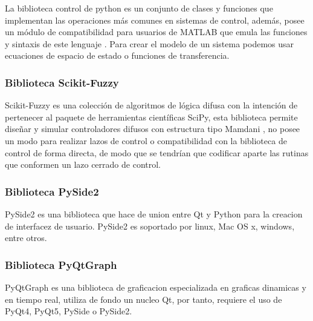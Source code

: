             La biblioteca control de python es un conjunto de clases y funciones que implementan las operaciones más comunes en sistemas de control, además, posee un módulo de compatibilidad para usuarios de MATLAB que emula las funciones y sintaxis de este lenguaje \Parencite{pythoncontrol}. Para crear el modelo de un sistema podemos usar ecuaciones de espacio de estado o funciones de transferencia.

        \subsubsection{Biblioteca Scikit-Fuzzy}
            
            Scikit-Fuzzy es una colección de algoritmos de lógica difusa con la intención de pertenecer al paquete de herramientas científicas SciPy, esta biblioteca permite diseñar y simular controladores difusos con estructura tipo Mamdani \Parencite{warner2016fuzzy}, no posee un modo para realizar lazos de control o compatibilidad con la biblioteca de control de forma directa, de modo que se tendrían que codificar aparte las rutinas que conformen un lazo cerrado de control.

        \subsubsection{Biblioteca PySide2}

            PySide2 es una biblioteca que hace de union entre Qt y Python para la creacion de interfacez de usuario. PySide2 es soportado por linux, Mac OS x, windows, entre otros.
            
        \subsubsection{Biblioteca PyQtGraph}
                
            PyQtGraph es una biblioteca de graficacion especializada en graficas dinamicas y en tiempo real, utiliza de fondo un nucleo Qt, por tanto, requiere el uso de PyQt4, PyQt5, PySide o PySide2.